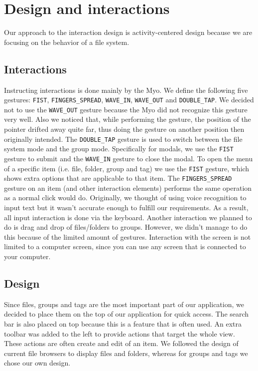\documentclass{article}
\begin{document}
\newpage

\section{Design and interactions}

Our approach to the interaction design is activity-centered design because we are focusing on the behavior of a file system. 

\subsection{Interactions}
Instructing interactions is done mainly by the Myo. We define the following five gestures: \texttt{FIST}, \texttt{FINGERS\_SPREAD}, \texttt{WAVE\_IN}, \texttt{WAVE\_OUT} and \texttt{DOUBLE\_TAP}. We decided not to use the \texttt{WAVE\_OUT} gesture because the Myo did not recognize this gesture very well. Also we noticed that, while performing the gesture, the position of the pointer drifted away quite far, thus doing the gesture on another position then originally intended. The \texttt{DOUBLE\_TAP} gesture is used to switch between the file system mode and the group mode. Specifically for modals, we use the \texttt{FIST} gesture to submit and the \texttt{WAVE\_IN} gesture to close the modal. To open the menu of a specific item (i.e. file, folder, group and tag) we use the \texttt{FIST} gesture, which shows extra options that are applicable to that item. The \texttt{FINGERS\_SPREAD} gesture on an item (and other interaction elements) performs the same operation as a normal click would do. Originally, we thought of using voice recognition to input text but it wasn't accurate enough to fulfill our requirements. As a result, all input interaction is done via the keyboard. Another interaction we planned to do is drag and drop of files/folders to groups. However, we didn't manage to do this because of the limited amount of gestures. Interaction with the screen is not limited to a computer screen, since you can use any screen that is connected to your computer.

\subsection{Design}

Since files, groups and tags are the most important part of our application, we decided to place them on the top of our application for quick access. The search bar is also placed on top because this is a feature that is often used. An extra toolbar was added to the left to provide actions that target the whole view. These actions are often create and edit of an item. We followed the design of current file browsers to display files and folders, whereas for groups and tags we chose our own design.
\end{document}
